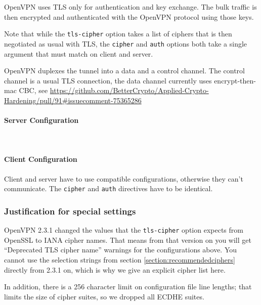 OpenVPN uses TLS only for authentication and key exchange. The
bulk traffic is then encrypted and authenticated with the OpenVPN
protocol using those keys.

Note that while the \verb|tls-cipher| option takes a list of ciphers
that is then negotiated as usual with TLS, the \verb|cipher|
and \verb|auth| options both take a single argument that must match on
client and server.

OpenVPN duplexes the tunnel into a data and a control channel. The control
channel is a usual TLS connection, the data channel currently uses 
encrypt-then-mac CBC, see \url{https://github.com/BetterCrypto/Applied-Crypto-Hardening/pull/91#issuecomment-75365286}


\paragraph{Server Configuration}
~\\

\paragraph{Client Configuration}
Client and server have to use compatible configurations, otherwise they can't communicate.
The \verb|cipher| and \verb|auth| directives have to be identical.


\subsubsection{Justification for special settings}
OpenVPN 2.3.1 changed the values that the \verb|tls-cipher| option
expects from OpenSSL to IANA cipher names. That means from that
version on you will get ``Deprecated TLS cipher name'' warnings for
the configurations above. You cannot use the selection strings from
section \ref{section:recommendedciphers} directly from 2.3.1 on, which
is why we give an explicit cipher list here.

In addition, there is a 256 character limit on configuration file line
lengths; that limits the size of cipher suites, so we dropped all
ECDHE suites.

